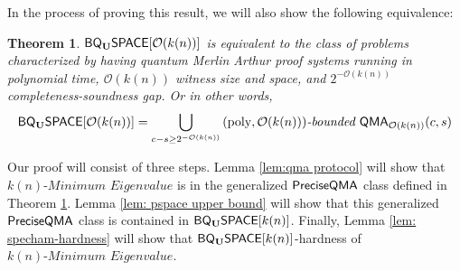 \documentclass[11pt]{article}
\newtheorem{theorem}{Theorem}
\theoremstyle{definition}
\theoremstyle{remark}
\newcommand\QMA{{\sf{QMA}}}
\newcommand\preciseQMA{{\sf{PreciseQMA}}}
\newcommand\bddQMA[5]{{\left(#1,#2\right)}\textit{-bounded }\QMA_{#3}(#4,#5)}
\newcommand\spechamiltonian[1]{\ensuremath{#1}\textit{-Minimum Eigenvalue}}
\newcommand{\classfont}{\sf}
\newcommand{\Unitary}{\mathbf{U}}
\newcommand{\unitaryBQSPACE}[1]{{\classfont{BQ}_\Unitary\classfont{SPACE}}[#1]}
\newcommand\bigoh{\mathcal{O}}
\DeclareMathOperator{\poly}{poly}
\begin{document}
In the process of proving this result, we will also show the following equivalence:
\begin{theorem} \label{thm: equivalence}
$\unitaryBQSPACE{\mathcal{O}(k(n))}$ is equivalent to the class of problems characterized by having quantum Merlin Arthur proof systems running in polynomial time, $\mathcal{O}(k(n))$ witness size and space, and $2^{-\mathcal{O}(k(n))}$ completeness-soundness gap. Or in other words,
\begin{equation}
\unitaryBQSPACE{\mathcal{O}(k(n))}= \bigcup_{c - s \ge 2^{-\bigoh(k(n))}}\bddQMA{\poly}{\bigoh(k(n))}{\bigoh(k(n))}{c}{s} \nonumber
\end{equation}
\end{theorem}

Our proof will consist of three steps. Lemma \ref{lem:qma protocol} will show that $\spechamiltonian{k(n)}$ is in the generalized $\preciseQMA$ class defined in Theorem \ref{thm: equivalence}. Lemma \ref{lem: pspace upper bound} will show that this generalized $\preciseQMA$ class is contained in $\unitaryBQSPACE{k(n)}$. Finally, Lemma \ref{lem: specham-hardness} will show that $\unitaryBQSPACE{k(n)}$-hardness of $\spechamiltonian{k(n)}$.
\end{document}

